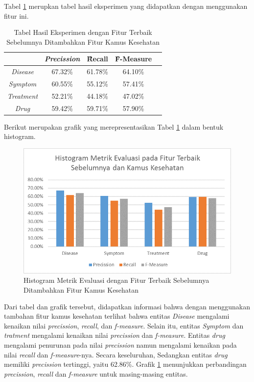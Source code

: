 	Tabel \ref{table:owndict2} merupkan tabel hasil eksperimen yang didapatkan dengan menggunakan fitur ini.
	
	\begin{table}
		\centering
		\caption{Tabel Hasil Eksperimen dengan Fitur Terbaik Sebelumnya Ditambahkan Fitur Kamus Kesehatan}
		\begin{tabular}{|c|c|c|c|c|}
			\hline
			                      & \textit{Precission} & \f{\f{Recall}} & \f{\f{F-Measure}} \\ \hline
			\textit{Disease}      & 67.32\%             & 61.78\%        & 64.10\%           \\ \hline
			\textit{Symptom}      & 60.55\%             & 55.12\%        & 57.41\%           \\ \hline
			\textit{Treatment}    & 52.21\%             & 44.18\%        & 47.02\%           \\ \hline
			\textit{Drug}		  & 59.42\%             & 59.71\%        & 57.90\%           \\ \hline
		\end{tabular}
		\label{table:owndict2}
	\end{table}
	
	Berikut merupakan grafik yang merepresentasikan Tabel \ref{table:owndict2} dalam bentuk histogram.
	
	\begin{figure}
		\centering
		\includegraphics[width=0.85\linewidth]{images/histogram2}
		\caption{Histogram Metrik Evaluasi dengan Fitur Terbaik Sebelumnya Ditambahkan Fitur Kamus Kesehatan}
		\label{fig:owndict2}
	\end{figure}

	Dari tabel dan grafik tersebut, didapatkan informasi bahwa dengan menggunakan tambahan fitur kamus kesehatan terlihat bahwa entitas \textit{Disease} mengalami kenaikan nilai \textit{precission}, \textit{recall}, dan \textit{f-measure}. Selain itu, entitas \textit{Symptom} dan \textit{tratment} mengalami kenaikan nilai \textit{precission} dan \textit{f-measure}. Entitas \textit{drug} mengalami penurunan pada nilai \textit{precission} namun mengalami kenaikan pada nilai \textit{recall} dan \textit{f-measure}-nya. Secara keseluruhan,  Sedangkan entitas \textit{drug} memiliki \textit{precission} tertinggi, yaitu 62.86\%. Grafik \ref{fig:owndict2} menunjukkan perbandingan \textit{precission}, \textit{recall} dan \textit{f-measure} untuk masing-masing entitas.


